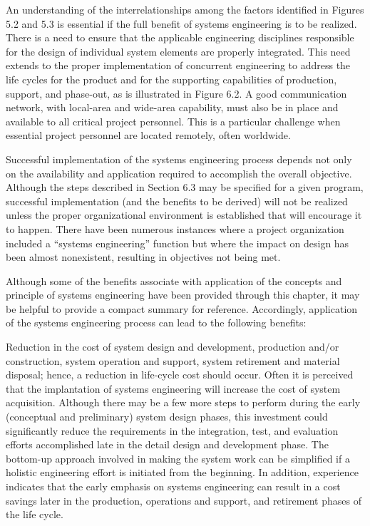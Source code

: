 An understanding of the interrelationships among the factors identified in Figures 5.2 and 5.3 is essential if the full benefit of systems engineering is to be realized. There is a need to ensure that the applicable engineering disciplines responsible for the design of individual system elements are properly integrated. This need extends to the proper implementation of concurrent engineering to address the life cycles for the product and for the supporting capabilities of production, support, and phase-out, as is illustrated in Figure 6.2. A good communication network, with local-area and wide-area capability, must also be in place and available to all critical project personnel. This is a particular challenge when essential project personnel are located remotely, often worldwide.

Successful implementation of the systems engineering process depends not only on the availability and application required to accomplish the overall objective. Although the steps described in Section 6.3 may be specified for a given program, successful implementation (and the benefits to be derived) will not be realized unless the proper organizational environment is established that will encourage it to happen. There have been numerous instances where a project organization included a “systems engineering” function but where the impact on design has been almost nonexistent, resulting in objectives not being met.

Although some of the benefits associate with application of the concepts and principle of systems engineering have been provided through this chapter, it may be helpful to provide a compact summary for reference. Accordingly, application of the systems engineering process can lead to the following benefits:

Reduction in the cost of system design and development, production and/or construction, system operation and support, system retirement and material disposal; hence, a reduction in life-cycle cost should occur. Often it is perceived that the implantation of systems engineering will increase the cost of system acquisition. Although there may be a few more steps to perform during the early (conceptual and preliminary) system design phases, this investment could significantly reduce the requirements in the integration, test, and evaluation efforts accomplished late in the detail design and development phase. The bottom-up approach involved in making the system work can be simplified if a holistic engineering effort is initiated from the beginning. In addition, experience indicates that the early emphasis on systems engineering can result in a cost savings later in the production, operations and support, and retirement phases of the life cycle.

